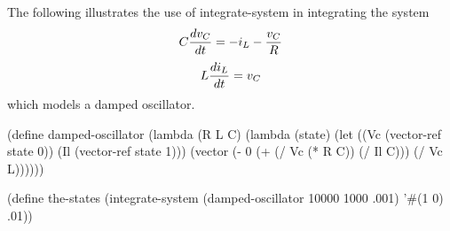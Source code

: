 \bigskip
The following illustrates the use of {\cf integrate-system} in
integrating the system
$$ C {dv_C \over dt} = -i_L - {v_C \over R}$$\nobreak
$$ L {di_L \over dt} = v_C$$
which models a damped oscillator.

\begin{schemenoindent}
(define damped-oscillator
  (lambda (R L C)
    (lambda (state)
      (let ((Vc (vector-ref state 0))
            (Il (vector-ref state 1)))
        (vector (- 0 (+ (/ Vc (* R C)) (/ Il C)))
                (/ Vc L))))))

(define the-states
  (integrate-system
     (damped-oscillator 10000 1000 .001)
     '\#(1 0)
     .01))%
\end{schemenoindent}




